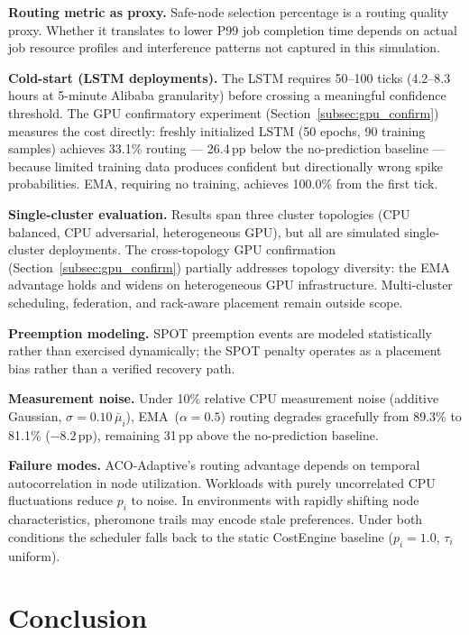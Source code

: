 \documentclass[conference]{IEEEtran}
\begin{document}
\textbf{Routing metric as proxy.} Safe-node selection percentage is a
routing quality proxy. Whether it translates to lower P99 job completion
time depends on actual job resource profiles and interference patterns not
captured in this simulation.

\textbf{Cold-start (LSTM deployments).} The LSTM requires 50--100 ticks
(4.2--8.3 hours at 5-minute Alibaba granularity) before crossing a
meaningful confidence threshold. The GPU confirmatory experiment
(Section~\ref{subsec:gpu_confirm}) measures the cost directly: freshly
initialized LSTM (50 epochs, 90 training samples) achieves 33.1\%
routing --- 26.4\,pp below the no-prediction baseline --- because
limited training data produces confident but directionally wrong spike
probabilities. EMA, requiring no training, achieves 100.0\% from the
first tick.

\textbf{Single-cluster evaluation.} Results span three cluster topologies
(CPU balanced, CPU adversarial, heterogeneous GPU), but all are simulated
single-cluster deployments. The cross-topology GPU confirmation
(Section~\ref{subsec:gpu_confirm}) partially addresses topology diversity:
the EMA advantage holds and widens on heterogeneous GPU infrastructure.
Multi-cluster scheduling, federation, and rack-aware placement remain
outside scope.

\textbf{Preemption modeling.} SPOT preemption events are modeled
statistically rather than exercised dynamically; the SPOT penalty operates
as a placement bias rather than a verified recovery path.

\textbf{Measurement noise.} Under 10\% relative CPU measurement noise
(additive Gaussian, $\sigma{=}0.10\,\bar{\mu}_i$), EMA~($\alpha{=}0.5$)
routing degrades gracefully from 89.3\% to 81.1\% ($-8.2$\,pp), remaining
31\,pp above the no-prediction baseline.

\textbf{Failure modes.} ACO-Adaptive's routing advantage depends on
temporal autocorrelation in node utilization. Workloads with purely
uncorrelated CPU fluctuations reduce $p_i$ to noise. In environments with
rapidly shifting node characteristics, pheromone trails may encode stale
preferences. Under both conditions the scheduler falls back to the static
CostEngine baseline ($p_i{=}1.0$, $\tau_i$ uniform).


\section{Conclusion}
\end{document}
